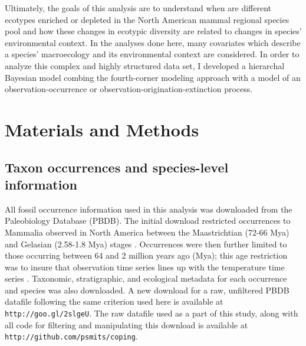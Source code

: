 Ultimately, the goals of this analysis are to understand when are different ecotypes enriched or depleted in the North American mammal regional species pool and how these changes in ecotypic diversity are related to changes in species' environmental context. In the analyses done here, many covariates which describe a species' macroecology and its environmental context are considered. In order to analyze this complex and highly structured data set, I developed a hierarchal Bayesian model combing the fourth-corner modeling approach with a model of an observation-occurrence or observation-origination-extinction process. %

\section*{Materials and Methods}

\subsection*{Taxon occurrences and species-level information}
All fossil occurrence information used in this analysis was downloaded from the Paleobiology Database (PBDB). The initial download restricted occurrences to Mammalia observed in North America between the Maastrichtian (72-66 Mya) and Gelasian (2.58-1.8 Mya) stages \citep{Cohen2015}. Occurrences were then further limited to those occurring between 64 and 2 million years ago (Mya); this age restriction was to insure that observation time series lines up with the temperature time series \citep{Cramer2011}. Taxonomic, stratigraphic, and ecological metadata for each occurrence and species was also downloaded. A new download for a raw, unfiltered PBDB datafile following the same criterion used here is available at \texttt{http://goo.gl/2slgeU}. The raw datafile used as a part of this study, along with all code for filtering and manipulating this download is available at \texttt{http://github.com/psmits/coping}.

